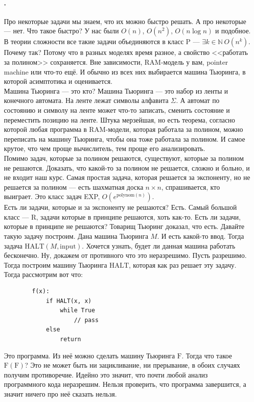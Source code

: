 \documentclass{article}
\newcommand{\pseudo}{PseudoLexer.py:PseudoLexer -x}
\begin{document}
    \paragraph{.}
    Про некоторые задачи мы знаем, что их можно быстро решать. А про некоторые --- нет. Что такое быстро? У нас были $O(n)$, $O(n^2)$, $O(n\log n)$ и подобное. В теории сложности все такие задачи объединяются в класс P --- $\exists k\in\mathbb N~O(n^k)$. Почему так? Потому что в разных моделях время разное, а свойство <<работать за полином>> сохраняется. Вне зависимости, RAM-модель у вам, pointer machine или что-то ещё. И обычно из всех них выбирается машина Тьюринга, в которой асимптотика и оценивается.\\
    Машина Тьюринга --- это кто? Машина Тьюринга --- это набор из ленты и конечного автомата. На ленте лежат символы алфавита $\Sigma$. А автомат по состоянию и символу на ленте может что-то записать, сменить состояние и переместить позицию на ленте. Штука мерзейшая, но есть теорема, согласно которой любая программа в RAM-модели, которая работала за полином, можно переписать на машину Тьюринга, чтобы она тоже работала за полином. И самое крутое, что чем проще вычислитель, тем проще его анализировать.\\
    Помимо задач, которые за полином решаются, существуют, которые за полином не решаются. Доказать, что какой-то за полином не решается, сложно и больно, и не входит наш курс. Самая простая задача, которая решается за экспоненту, но не решается за полином --- есть шахматная доска $n\times n$, спрашивается, кто выиграет. Это класс задач EXP, $O(e^{\mathrm{polynom}(n)})$.\\
    Есть ли задачи, которые и за экспоненту не решаются? Есть. Самый большой класс --- R, задачи которые в принципе решаются, хоть как-то. Есть ли задачи, которые в принципе не решаются? Товарищ Тьюринг доказал, что есть. Давайте такую задачу построим. Дана машина Тьюринга $M$. И есть какой-то ввод. Тогда задача $\mathrm{HALT}(M, \mathrm{input})$. Хочется узнать, будет ли данная машина работать бесконечно. Ну, докажем от противного что это неразрешимо. Пусть разрешимо. Тогда построим машину Тьюринга $\mathrm{HALT}$, которая как раз решает эту задачу. Тогда рассмотрим вот что:
    \begin{verbatim}
        f(x):
            if HALT(x, x)
                while True
                    // pass
            else
                return
    \end{verbatim}
    Это программа. Из неё можно сделать машину Тьюринга $\mathrm{F}$. Тогда что такое $\mathrm{F}(\mathrm{F})$? Это не может быть ни зацикливание, ни прерывание, в обоих случаях получим противоречие. Идейно это значит, что почти любой анализ программного кода неразрешим. Нельзя проверить, что программа завершится, а значит ничего про неё сказать нельзя.\\
\end{document}
